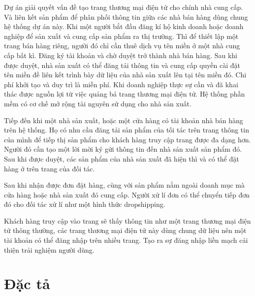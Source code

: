 \documentclass[11pt]{report}
\begin{document}
Dự án giải quyết vấn đề tạo trang thương mại điện tử cho chính nhà cung cấp. Và liên kết sản phẩm để phân phối thông tin giữa các nhà bán hàng dùng chung hệ thống dự án này. Khi một người bắt đầu đăng kí hộ kinh doanh hoặc doanh nghiệp để sản xuất và cung cấp sản phẩm ra thị trường. Thì để thiết lập một trang bán hàng riêng, người đó chỉ cần thuê dịch vụ tên miền ở một nhà cung cấp bất kì. Đăng ký tài khoản và chờ duyệt trở thành nhà bán hàng. Sau khi được duyệt, nhà sản xuất có thể đăng tải thông tin và cung cấp quyền cài đặt tên miền đề liên kết trình bày dữ liệu của nhà sản xuất lên tại tên miền đó. Chi phí khởi tạo và duy trì là miễn phí. Khi doanh nghiệp thực sự cần và đã khai thác được nguồn lợi từ việc quảng bá trang thương mại điện tử. Hệ thống phần mềm có cơ chế mở rộng tài nguyên sử dụng cho nhà sản xuất.

Tiếp đến khi một nhà sản xuất, hoặc một cửa hàng có tài khoản nhà bán hàng trên hệ thống. Họ có nhu cầu đăng tải sản phẩm của tối tác trên trang thông tin của mình để tiếp thị sản phẩm cho khách hàng truy cập trang được đa dạng hơn. Người đó cần tạo một lời mời ký gửi thông tin đến nhà sản xuất sản phẩm đó. Sau khi được duyệt, các sản phẩm của nhà sản xuất đã hiện thì và có thể đặt hàng ở trên trang của đối tác.

Sau khi nhận được đơn đặt hàng, cùng với sản phẩm nằm ngoài doanh mục mà cửa hàng hoặc nhà sản xuất đó cung cấp. Người xử lí đơn có thể chuyển tiếp đơn đó cho đối tác xử lí như một hình thức dropshipping.

Khách hàng truy cập vào trang sẽ thấy thông tin như một trang thương mại điện tử thông thường, các trang thương mại điện tử này dùng chung dữ liệu nên một tài khoản có thể đăng nhập trên nhiều trang. Tạo ra sự đăng nhập liền mạch cải thiện trải nghiệm người dùng.
\section{Đặc tả}


\end{document}
